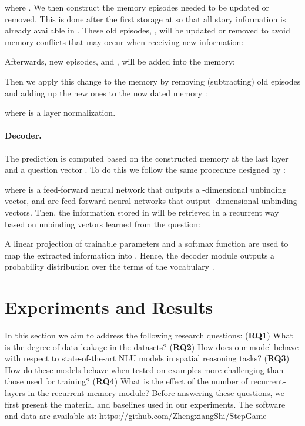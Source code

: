 \documentclass[letterpaper]{article} \usepackage{aaai22}  \usepackage{times}  \usepackage{helvet}  \usepackage{courier}  \usepackage[hyphens]{url}  \usepackage{graphicx} \urlstyle{rm} \def\UrlFont{\rm}  \usepackage{natbib}  \usepackage{caption} \DeclareCaptionStyle{ruled}{labelfont=normalfont,labelsep=colon,strut=off} \frenchspacing  \setlength{\pdfpagewidth}{8.5in}  \setlength{\pdfpageheight}{11in}  \usepackage{algorithm}
\begin{document}
where .
We then construct the memory episodes needed to be updated or removed. This is done after the first storage at  so that all story information is already available in . 
These old episodes, , will be updated or removed to avoid memory conflicts that may occur when receiving new information:

Afterwards, new episodes,  and , will be added into the memory:

Then we apply this change to the memory by removing (subtracting) old episodes and adding up the new ones to the now dated memory :

where  is a layer normalization. 

\paragraph{Decoder.} The prediction is computed based on the constructed memory  at the last layer and a question vector . To do this we follow the same procedure designed by \citet{schlag2018learning}:

where  is a feed-forward neural network that outputs a -dimensional unbinding vector, and  are feed-forward neural networks that output -dimensional unbinding vectors. Then, the information stored in  will be retrieved in a recurrent way based on unbinding vectors learned from the question:

A linear projection of trainable parameters  and a softmax function are used to map the extracted information into . Hence, the decoder module outputs a probability distribution over the terms of the vocabulary .




 
\section{Experiments and Results}
In this section we aim to address the following research questions:
(\textbf{RQ1}) What is the degree of data leakage in the datasets?
(\textbf{RQ2}) How does our model behave with respect to state-of-the-art NLU models in spatial reasoning tasks? 
(\textbf{RQ3}) How do these models behave when tested on examples more challenging than those used for training? 
(\textbf{RQ4}) What is the effect of the number of recurrent-layers in the recurrent memory module?
Before answering these questions, we first present the material and baselines used in our experiments.
The software and data are available at: \url{https://github.com/ZhengxiangShi/StepGame}
\end{document}
